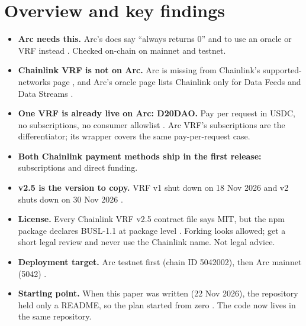 \documentclass[11pt,a4paper]{article}
\begin{document}
\section{Overview and key findings}
\begin{itemize}
  \item \textbf{Arc needs this.} Arc's docs say  ``always returns 0'' and to use an oracle or VRF instead \cite{arcevm}. Checked on-chain on mainnet and testnet.
  \item \textbf{Chainlink VRF is not on Arc.} Arc is missing from Chainlink's supported-networks page \cite{clnetworks}, and Arc's oracle page lists Chainlink only for Data Feeds and Data Streams \cite{arcoracles}.
  \item \textbf{One VRF is already live on Arc: D20DAO.} Pay per request in USDC, no subscriptions, no consumer allowlist \cite{d20dao}. Arc VRF's subscriptions are the differentiator; its wrapper covers the same pay-per-request case.
  \item \textbf{Both Chainlink payment methods ship in the first release:} subscriptions and direct funding.
  \item \textbf{v2.5 is the version to copy.} VRF v1 shut down on 18 Nov 2026 and v2 shuts down on 30 Nov 2026 \cite{clvrf,clmigv2,clmigv1}.
  \item \textbf{License.} Every Chainlink VRF v2.5 contract file says MIT, but the npm package  declares BUSL-1.1 at package level \cite{cllicense,clnpm}. Forking looks allowed; get a short legal review and never use the Chainlink name. Not legal advice.
  \item \textbf{Deployment target.} Arc testnet first (chain ID 5042002), then Arc mainnet (5042) \cite{arcrpc}.
  \item \textbf{Starting point.} When this paper was written (22 Nov 2026), the repository  held only a README, so the plan started from zero \cite{repoarc}. The code now lives in the same repository.
\end{itemize}

\end{document}

